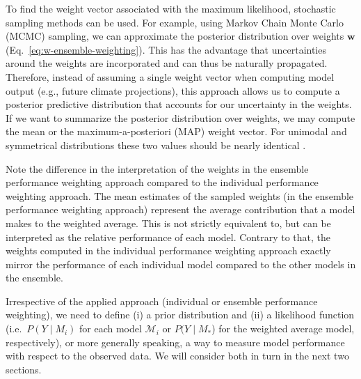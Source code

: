 To find the weight vector associated with the maximum likelihood, stochastic sampling methods can be used.
For example, using Markov Chain Monte Carlo (MCMC) sampling, we can approximate the posterior distribution over weights $\mathbf{w}$ (Eq.~\eqref{eq:w-ensemble-weighting}).
This has the advantage that uncertainties around the weights are incorporated and can thus be naturally propagated.
Therefore, instead of assuming a single weight vector when computing model output (e.g., future climate projections), this approach allows us to compute a posterior predictive distribution that accounts for our uncertainty in the weights.
If we want to summarize the posterior distribution over weights, we may compute the mean or the maximum-a-posteriori (MAP) weight vector.
For unimodal and symmetrical distributions these two values should be nearly identical \citep[for an overview on Bayesian data analysis see][]{gelmanBayesianDataAnalysis2013}. 

Note the difference in the interpretation of the weights in the ensemble performance weighting approach compared to the individual performance weighting approach.
The mean estimates of the sampled weights (in the ensemble performance weighting approach) represent the average contribution that a model makes to the weighted average. This is not strictly equivalent to, but can be interpreted as the relative performance of each model.
Contrary to that, the weights computed in the individual performance weighting approach exactly mirror the performance of each individual model compared to the other models in the ensemble.

Irrespective of the applied approach (individual or ensemble performance weighting), we need to define (i) a prior distribution and (ii) a likelihood function (i.e.~$P(Y\mid M_i)$ for each model $\mathcal{M}_i$ or $P(Y\mid M_*$) for the weighted average model, respectively), or more generally speaking, a way to measure model performance with respect to the observed data. We will consider both in turn in the next two sections.

